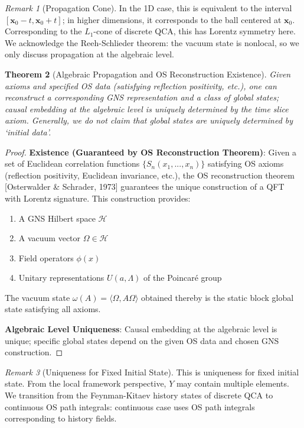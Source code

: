 \documentclass[11pt]{article}
\newtheorem{theorem}{Theorem}[section]
\theoremstyle{definition}
\theoremstyle{remark}
\newtheorem{remark}[theorem]{Remark}
\begin{document}
\begin{remark}[Propagation Cone]
In the 1D case, this is equivalent to the interval \( [\mathbf{x}_0 - t, \mathbf{x}_0 + t] \); in higher dimensions, it corresponds to the ball centered at \( \mathbf{x}_0 \). Corresponding to the \( L_1 \)-cone of discrete QCA, this has Lorentz symmetry here. We acknowledge the Reeh-Schlieder theorem: the vacuum state is nonlocal, so we only discuss propagation at the algebraic level.
\end{remark}

\begin{theorem}[Algebraic Propagation and OS Reconstruction Existence]\label{thm:reconstruction}
Given axioms and specified OS data (satisfying reflection positivity, etc.), one can reconstruct a corresponding GNS representation and a class of global states; causal embedding at the algebraic level is uniquely determined by the time slice axiom. Generally, we do not claim that global states are uniquely determined by `initial data'.
\end{theorem}

\begin{proof}
\textbf{Existence (Guaranteed by OS Reconstruction Theorem)}: Given a set of Euclidean correlation functions \( \{S_n(x_1,...,x_n)\} \) satisfying OS axioms (reflection positivity, Euclidean invariance, etc.), the OS reconstruction theorem [Osterwalder \& Schrader, 1973] guarantees the unique construction of a QFT with Lorentz signature. This construction provides:
\begin{enumerate}
\item A GNS Hilbert space \( \mathcal{H} \)
\item A vacuum vector \( \Omega \in \mathcal{H} \)
\item Field operators \( \phi(x) \)
\item Unitary representations \( U(a,\Lambda) \) of the Poincaré group
\end{enumerate}

The vacuum state \( \omega(A) = \langle \Omega, A\Omega \rangle \) obtained thereby is the static block global state satisfying all axioms.

\textbf{Algebraic Level Uniqueness}: Causal embedding at the algebraic level is unique; specific global states depend on the given OS data and chosen GNS construction.
\end{proof}

\begin{remark}[Uniqueness for Fixed Initial State]
This is uniqueness for fixed initial state. From the local framework perspective, \( Y \) may contain multiple elements. We transition from the Feynman-Kitaev history states of discrete QCA to continuous OS path integrals: continuous case uses OS path integrals corresponding to history fields.
\end{remark}
\end{document}
